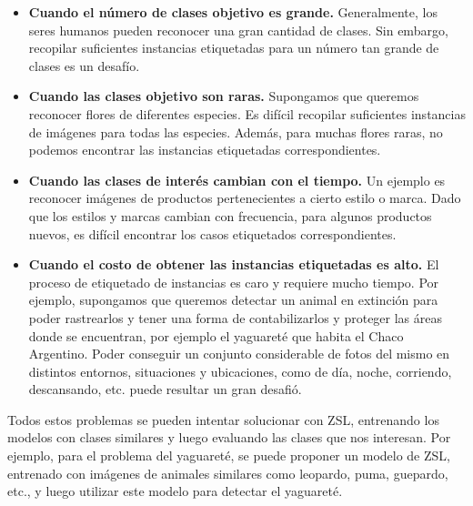\begin{itemize}
	\item \textbf{Cuando el número de clases objetivo es grande.} Generalmente, los seres humanos pueden reconocer una gran cantidad de clases. Sin embargo, recopilar suficientes instancias etiquetadas para un número tan grande de clases es un desafío.
	
	\item \textbf{Cuando las clases objetivo son raras.} Supongamos que queremos reconocer flores de diferentes especies. Es difícil recopilar suficientes instancias de imágenes para todas las especies. Además, para muchas flores raras, no podemos encontrar las instancias etiquetadas correspondientes.
	
	\item \textbf{Cuando las clases de interés cambian con el tiempo.} Un ejemplo es reconocer imágenes de productos pertenecientes a cierto estilo o marca. Dado que los estilos y marcas cambian con frecuencia, para algunos productos nuevos, es difícil encontrar los casos etiquetados correspondientes.
	
	\item \textbf{Cuando el costo de obtener las instancias etiquetadas es alto.} El proceso de etiquetado de instancias es caro y requiere mucho tiempo. Por ejemplo, supongamos que queremos detectar un animal en extinción para poder rastrearlos y tener una forma de contabilizarlos y proteger las áreas donde se encuentran, por ejemplo el yaguareté que habita el Chaco Argentino. Poder conseguir un conjunto considerable de fotos del mismo en distintos entornos, situaciones y ubicaciones, como de día, noche, corriendo, descansando, etc. puede resultar un gran desafió.
\end{itemize}

Todos estos problemas se pueden intentar solucionar con ZSL, entrenando los modelos con clases similares y luego evaluando las clases que nos interesan. Por ejemplo, para el problema del  yaguareté, se puede proponer un modelo de ZSL, entrenado con imágenes de animales similares como leopardo, puma, guepardo, etc., y luego utilizar este modelo para detectar el yaguareté.\\
 

